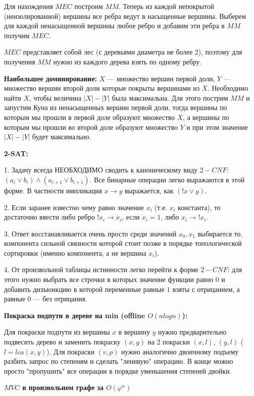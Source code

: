 Для нахождения $MEC$ построим $MM$. Теперь из каждой непокрытой (неизолированной) вершины все ребра ведут
в насыщенные вершины. Выберем для каждой ненасыщенной вершины любое ребро и добавим эти ребра в $MM$ получим $MEC$.

$MEC$ представляет собой лес (с деревьями диаметра не более $2$), поэтому для получения $MM$ нужно из каждого дерева
взять по одному ребру.

\textbf{Наибольшее доминирование:} $X$ --- множество вершин первой доли, $Y$ --- множество вершин второй доли которые покрыты вершинами из $X$.
Необходимо найти $X$, чтобы величина $|X| - |Y|$ была максимальна. Для этого пострим $MM$ и запустим Куна из ненасыщенных
вершин первой доли, тогда вершины по которым мы прошли в первой доле образуют множество $X$, а вершины по которым мы прошли во второй
доле образуют множество $Y$ и при этом значение $|X| - |Y|$ будет максимально.

\textbf{2-SAT:}

1. Задачу всегда НЕОБХОДИМО сводить к каноническому виду $2-CNF$: $(a_i \vee b_i) \wedge (a_{i + 1} \vee b_{i + 1})$.
Все бинарные операции легко выражаются в этой форме. В частности импликация $x \rightarrow y$ выражается,
как $(!x \vee y)$.

2. Если заранее известно чему равно значение $x_i$ (т.е. $x_i$ константа), то достаточно ввести либо ребро $!x_i \rightarrow x_i$, если $x_i = 1$,
либо $x_i \rightarrow !x_i$.

3. Ответ восстанавливается очень просто среди значений $x_0, x_1$ выбирается то, компонента сильной связности
которой стоит позже в порядке топологической сортировки (именно компонента, а не вершина $x_i$).

4. От произвольной таблицы истинности легко перейти к форме $2-CNF$: для этого нужно выбрать все строчки в которых значение
функции равно $0$ и добавить дизъюнкцию в которой переменные равные $1$ взяты с отрицанием, а равные $0$ --- без отрицания.

\textbf{Покраска подпути в дереве на min (offline $O(nlogn)$):}

Для покраски подпути из вершины $x$ в вершину $y$ нужно предварительно подвесить дерево и заменить покраску
$(x, y)$ на $2$ покраски $(x, l)$, $(y, l)$ ($l=lca(x, y)$). Для покраски $(v, p)$ нужно аналогично двоичному подъему разбить запрос по степеням 
и сделать "ленивую" операцию. В конце можно просто "пропушить" все операции в порядке уменьшения степеней двойки.

\textbf{$MVC$ в произвольном графе за $O(\varphi^n)$}


